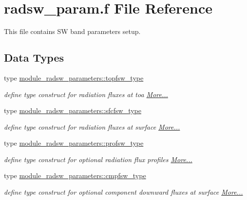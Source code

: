 \hypertarget{radsw__param_8f}{}\section{radsw\+\_\+param.\+f File Reference}
\label{radsw__param_8f}


This file contains SW band parameters setup.  


\subsection*{Data Types}
\begin{DoxyCompactItemize}
\item 
type \hyperlink{namespacemodule__radsw__parameters_structmodule__radsw__parameters_1_1topfsw__type}{module\+\_\+radsw\+\_\+parameters\+::topfsw\+\_\+type}
\begin{DoxyCompactList}\small\item\em define type construct for radiation fluxes at toa  \hyperlink{namespacemodule__radsw__parameters_structmodule__radsw__parameters_1_1topfsw__type}{More...}\end{DoxyCompactList}\item 
type \hyperlink{group__module__radsw__main_structmodule__radsw__parameters_1_1sfcfsw__type}{module\+\_\+radsw\+\_\+parameters\+::sfcfsw\+\_\+type}
\begin{DoxyCompactList}\small\item\em define type construct for radiation fluxes at surface  \hyperlink{group__module__radsw__main_structmodule__radsw__parameters_1_1sfcfsw__type}{More...}\end{DoxyCompactList}\item 
type \hyperlink{group__module__radsw__main_structmodule__radsw__parameters_1_1profsw__type}{module\+\_\+radsw\+\_\+parameters\+::profsw\+\_\+type}
\begin{DoxyCompactList}\small\item\em define type construct for optional radiation flux profiles  \hyperlink{group__module__radsw__main_structmodule__radsw__parameters_1_1profsw__type}{More...}\end{DoxyCompactList}\item 
type \hyperlink{group__module__radsw__main_structmodule__radsw__parameters_1_1cmpfsw__type}{module\+\_\+radsw\+\_\+parameters\+::cmpfsw\+\_\+type}
\begin{DoxyCompactList}\small\item\em define type construct for optional component downward fluxes at surface  \hyperlink{group__module__radsw__main_structmodule__radsw__parameters_1_1cmpfsw__type}{More...}\end{DoxyCompactList}\end{DoxyCompactItemize}
